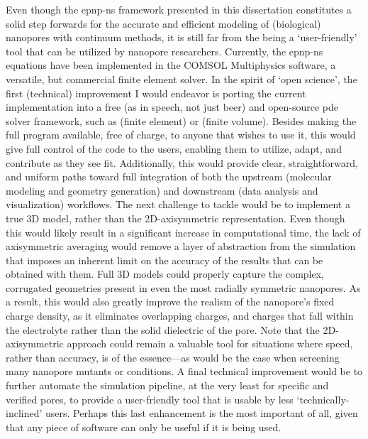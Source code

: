 Even though the \gls{epnp-ns} framework presented in this dissertation constitutes a solid step forwards for
the accurate and efficient modeling of (biological) nanopores with continuum methods, it is still far from the
being a `user-friendly' tool that can be utilized by nanopore researchers. Currently, the \gls{epnp-ns}
equations have been implemented in the COMSOL Multiphysics software, a versatile, but commercial finite
element solver. In the spirit of `open science', the first (technical) improvement I would endeavor is porting
the current implementation into a free (as in speech, not just beer) and open-source \gls{pde} solver
framework, such as  (finite element) or  (finite volume). Besides making the full
program available, free of charge, to anyone that wishes to use it, this would give full control of the code
to the users, enabling them to utilize, adapt, and contribute as they see fit. Additionally, this would provide
clear, straightforward, and uniform paths toward full integration of both the upstream (molecular modeling and
geometry generation) and downstream (data analysis and visualization) workflows. The next challenge to tackle
would be to implement a true 3D model, rather than the 2D-axisymmetric representation. Even though this would
likely result in a significant increase in computational time, the lack of axisymmetric averaging would remove
a layer of abstraction from the simulation that imposes an inherent limit on the accuracy of the results that
can be obtained with them. Full 3D models could properly capture the complex, corrugated geometries present in
even the most radially symmetric nanopores. As a result, this would also greatly improve the realism of the
nanopore's fixed charge density, as it eliminates overlapping charges, and charges that fall within the
electrolyte rather than the solid dielectric of the pore. Note that the 2D-axisymmetric approach could remain
a valuable tool for situations where speed, rather than accuracy, is of the essence---as would be the case
when screening many nanopore mutants or conditions. A final technical improvement would be to further automate
the simulation pipeline, at the very least for specific and verified pores, to provide a
user-friendly tool that is usable by less `technically-inclined' users.\footnotemark%
%
%
Perhaps this last enhancement is the most important of all, given that any piece of software can only be
useful if it is being used.


